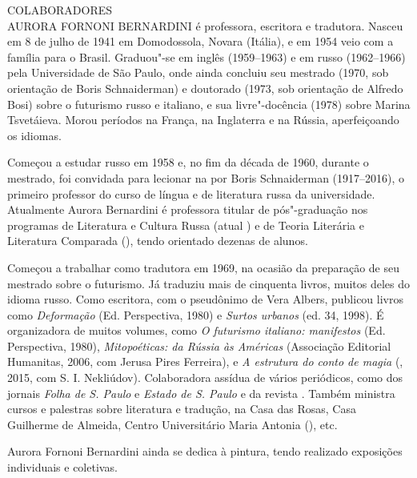 \newpage
\pagestyle{empty}
\MyriadPro

\noindent{}COLABORADORES\\

\noindent{}AURORA FORNONI BERNARDINI é professora, escritora e tradutora. Nasceu em
8 de julho de 1941 em Domodossola, Novara (Itália), e em 1954 veio com a
família para o Brasil. Graduou"-se em inglês (1959--1963) e em russo
(1962--1966) pela Universidade de São Paulo, onde ainda concluiu seu
mestrado (1970, sob orientação de Boris Schnaiderman) e doutorado (1973,
sob orientação de Alfredo Bosi) sobre o futurismo russo e italiano, e
sua livre"-docência (1978) sobre Marina Tsvetáieva. Morou períodos na
França, na Inglaterra e na Rússia, aperfeiçoando os idiomas.

Começou a estudar russo em 1958 e, no fim da década de 1960, durante o
mestrado, foi convidada para lecionar na \scalebox{0.8}{USP} por Boris Schnaiderman
(1917--2016), o primeiro professor do curso de língua e de literatura
russa da universidade. Atualmente Aurora Bernardini é professora titular
de pós"-graduação nos programas de Literatura e Cultura Russa (atual
\scalebox{0.8}{LETRA}) e de Teoria Literária e Literatura Comparada (\scalebox{0.8}{FFLCH/USP}), tendo
orientado dezenas de alunos.

Começou a trabalhar como tradutora em 1969, na ocasião da preparação de
seu mestrado sobre o futurismo. Já traduziu mais de cinquenta livros,
muitos deles do idioma russo. Como escritora, com o pseudônimo de Vera
Albers, publicou livros como \emph{Deformação} (Ed. Perspectiva, 1980) e
\emph{Surtos urbanos} (ed. 34, 1998). É organizadora de muitos volumes,
como \emph{O futurismo italiano: manifestos} (Ed. Perspectiva, 1980),
\emph{Mitopoéticas: da Rússia às Américas} (Associação Editorial
Humanitas, 2006, com Jerusa Pires Ferreira), e \emph{A estrutura do
conto de magia} (\scalebox{0.8}{UFSC}, 2015, com S. I. Nekliúdov). Colaboradora assídua
de vários periódicos, como dos jornais \emph{Folha de S. Paulo} e
\emph{Estado de S. Paulo} e da revista \scalebox{0.8}{CULT}. Também ministra
cursos e palestras sobre literatura e tradução, na Casa das Rosas, Casa
Guilherme de Almeida, Centro Universitário Maria Antonia (\scalebox{0.8}{USP}), etc.

Aurora Fornoni Bernardini ainda se dedica à pintura, tendo realizado
exposições individuais e coletivas.

